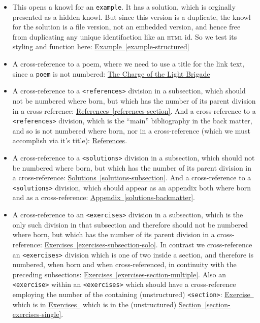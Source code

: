 \documentclass{sn-jnl}
\theoremstyle{thmstyleone}%
\theoremstyle{thmstyletwo}%
\theoremstyle{thmstylethree}%
\newcommand{\xreffont}{\relax}
\newcommand{\mono}[1]{\texttt{#1}}
\newcommand{\initialism}[1]{\textsc{\MakeLowercase{#1}}}
\numberwithin{equation}{section}
\begin{document}
\begin{itemize}[label=\textbullet]
\item{}This opens a knowl for an \mono{example}.  It has a solution, which is orginally presented as a hidden knowl.  But since this version is a duplicate, the knowl for the solution is a file version, not an embedded version, and hence free from duplicating any unique identifaction like an \initialism{HTML} id.  So we test its styling and function here: \hyperref[example-structured]{Example~{\xreffont\ref{example-structured}}}%
\item{}A cross-reference to a poem, where we need to use a title for the link text, since a \mono{poem} is not numbered: \hyperref[poem-light-brigade]{The Charge of the Light Brigade}%
\item{}A cross-reference to a \mono{<references>} division in a subsection, which should not be numbered where born, but which has the number of its parent division in a cross-reference: \hyperref[references-section]{References~{\xreffont\ref{references-section}}}.  And a cross-reference to a \mono{<references>} division, which is the ``main'' bibliography in the back matter, and so is not numbered where born, nor in a cross-reference (which we must accomplish via it's title): \hyperlink{references-backmatter}{References}.%
\item{}A cross-reference to a \mono{<solutions>} division in a subsection, which should not be numbered where born, but which has the number of its parent division in a cross-reference: \hyperref[solutions-subsection]{Solutions~{\xreffont\ref{solutions-subsection}}}.  And a cross-reference to a \mono{<solutions>} division, which should appear as an appendix both where born and as a cross-reference: \hyperref[solutions-backmatter]{Appendix~{\xreffont\ref{solutions-backmatter}}}.%
\item{}A cross-reference to an \mono{<exercises>} division in a subsection, which is the only such division in that subsection and therefore should not be numbered where born, but which has the number of its parent division in a cross-reference: \hyperref[exercises-subsection-solo]{Exercises~{\xreffont\ref{exercises-subsection-solo}}}.  In contrast we cross-reference an \mono{<exercises>} division which is one of two inside a section, and therefore is numbered, when born and when cross-referenced, in continuity with the preceding subsections: \hyperref[exercises-section-multiple]{Exercises~{\xreffont\ref{exercises-section-multiple}}}.  Also an \mono{<exercise>} within an \mono{<exercises>} which should have a cross-reference employing the number of the containing (unstructured) \mono{<section>}: \hyperlink{duplicate-divisional}{Exercise~{\xreffont 2}} which is in \hyperlink{exercise-collection}{Exercises~{\xreffont 1}} which is in the (unstructured) \hyperref[section-exercises-single]{Section~{\xreffont\ref{section-exercises-single}}}.%

\end{itemize}
\end{document}
